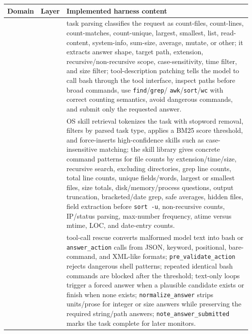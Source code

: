 \begin{table}[t]
\huge
\centering
\scriptsize
\setlength{\tabcolsep}{2.2pt}
\renewcommand{\arraystretch}{0.86}
\begin{tabular}{>{\centering\arraybackslash}m{}>{\centering\arraybackslash}m{}p{}}
\toprule
Domain & Layer & Implemented harness content \\
\midrule
\multirow{27}{*}{\centering\mbox{OS Interaction}}
& \multirow{5}{*}{Environment Contract Layer}
& task parsing classifies the request as count-files, count-lines,
count-matches, count-unique, largest, smallest, list, read-content, system-info,
sum-size, average, mutate, or other; it extracts answer shape, target path,
extension, recursive/non-recursive scope, case-sensitivity, time filter, and size
filter; tool-description patching tells the model to call bash through the tool
interface, inspect paths before broad commands, use \texttt{find}/\texttt{grep}/
\texttt{awk}/\texttt{sort}/\texttt{wc} with correct counting semantics, avoid
dangerous commands, and submit only the requested answer. \\
\cmidrule(lr){2-3}
& \multirow{6}{*}{Procedural Skill Layer}
& OS skill retrieval tokenizes the task with stopword removal, filters by parsed
task type, applies a BM25 score threshold, and force-inserts high-confidence
skills such as case-insensitive matching; the skill library gives concrete command
patterns for file counts by extension/time/size, recursive search, excluding
directories, grep line counts, total line counts, unique fields/words, largest or
smallest files, size totals, disk/memory/process questions, output truncation,
bracketed/date grep, safe averages, hidden files, field extraction before
\texttt{sort -u}, non-recursive counts, IP/status parsing, max-number frequency,
atime versus mtime, LOC, and date-entry counts. \\
\cmidrule(lr){2-3}
& \multirow{5}{*}{Action Realization Layer}
& tool-call rescue converts malformed model text into bash or
\texttt{answer\_action} calls from JSON, keyword, positional, bare-command, and XML-like
formats; \texttt{pre\_validate\_action} rejects dangerous shell patterns; repeated identical
bash commands are blocked after the threshold; text-only loops trigger a forced
answer when a plausible candidate exists or finish when none exists; \texttt{normalize\_answer}
strips units/prose for integer or size answers while preserving the required
string/path answers; \texttt{note\_answer\_submitted} marks the task complete for later
monitors. \\

\end{tabular}
\end{table}

